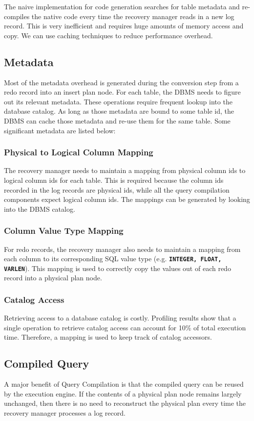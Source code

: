 \documentclass[12pt]{cmuthesis}
\newcommand{\dbSQL}[1]{\texttt{\textbf{#1}}\xspace}
\begin{document}
The naive implementation for code generation searches for table metadata and re-compiles the native code every time the recovery manager reads in a new log record. This is very inefficient and requires huge amounts of memory access and copy. We can use caching techniques to reduce performance overhead.

\subsection{Metadata}
Most of the metadata overhead is generated during the conversion step from a redo record into an insert plan node. For each table, the DBMS needs to figure out its relevant metadata. These operations require frequent lookup into the database catalog. As long as those metadata are bound to some table id, the DBMS can cache those metadata and re-use them for the same table. Some significant metadata are listed below:

\subsubsection{Physical to Logical Column Mapping}
The recovery manager needs to maintain a mapping from physical column ids to logical column ids for each table. This is required because the column ids recorded in the log records are physical ids, while all the query compilation components expect logical column ids. The mappings can be generated by looking into the DBMS catalog.
\subsubsection{Column Value Type Mapping}
For redo records, the recovery manager also needs to maintain a mapping from each column to its corresponding SQL value type (e.g. \dbSQL{INTEGER, FLOAT, VARLEN}). This mapping is used to correctly copy the values out of each redo record into a physical plan node.
\subsubsection{Catalog Access}
Retrieving access to a database catalog is costly. Profiling results show that a single operation to retrieve catalog access can account for 10\% of total execution time. Therefore, a mapping is used to keep track of catalog accessors.

\subsection{Compiled Query}
A major benefit of Query Compilation is that the compiled query can be reused by the execution engine. If the contents of a physical plan node remains largely unchanged, then there is no need to reconstruct the physical plan every time the recovery manager processes a log record.
\end{document}
